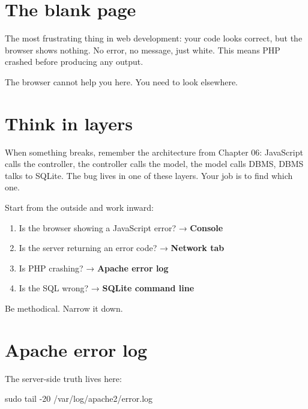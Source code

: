 \documentclass[11pt,a4paper,oneside]{book}
\newenvironment{Shaded}{\begin{snugshade}}{\end{snugshade}}
\newcommand{\FunctionTok}[1]{\textcolor[HTML]{06287E}{#1}}
\newcommand{\AttributeTok}[1]{\textcolor[HTML]{7D9029}{#1}}
\newcommand{\NormalTok}[1]{#1}
\providecommand{\tightlist}{%
  \setlength{\itemsep}{0pt}\setlength{\parskip}{0pt}}
\begin{document}
\hypertarget{the-blank-page}{%
\section{The blank page}\label{the-blank-page}}

The most frustrating thing in web development: your code looks
correct, but the browser shows nothing. No error, no message,
just white. This means PHP crashed before producing any output.

The browser cannot help you here. You need to look elsewhere.

\hypertarget{think-in-layers}{%
\section{Think in layers}\label{think-in-layers}}

When something breaks, remember the architecture from Chapter 06:
JavaScript calls the controller, the controller calls the model,
the model calls DBMS, DBMS talks to SQLite. The bug lives in one
of these layers. Your job is to find which one.

Start from the outside and work inward:

\begin{enumerate}
\def\labelenumi{\arabic{enumi}.}
\tightlist
\item
  Is the browser showing a JavaScript error? → \textbf{Console}
\item
  Is the server returning an error code? → \textbf{Network tab}
\item
  Is PHP crashing? → \textbf{Apache error log}
\item
  Is the SQL wrong? → \textbf{SQLite command line}
\end{enumerate}

Be methodical. Narrow it down.

\hypertarget{apache-error-log}{%
\section{Apache error log}\label{apache-error-log}}

The server-side truth lives here:

\begin{Shaded}
\begin{Highlighting}[]
\FunctionTok{sudo}\NormalTok{ tail }\AttributeTok{{-}20}\NormalTok{ /var/log/apache2/error.log}
\end{Highlighting}
\end{Shaded}
\end{document}
